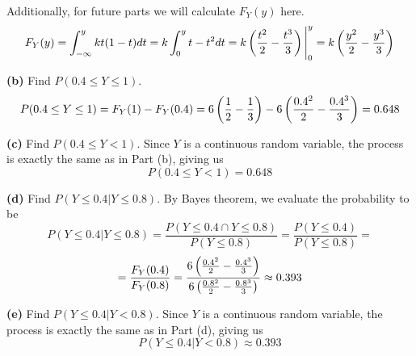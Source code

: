 \documentclass{exam}
\begin{document}
\begin{questions}
Additionally, for future parts we will calculate $F_Y(y)$ here.
$$F_Y(y) = \int_{-\infty}^y kt(1 - t)dt = k\int_0^yt - t^2dt = k\left( \frac{t^2}{2} - \frac{t^3}{3} \right)\Bigg|_0^y = k\left( \frac{y^2}{2} - \frac{y^3}{3} \right)$$

\newline
\textbf{(b) } Find $P(0.4 \leq Y \leq 1)$.
\sol
$$P(0.4 \leq Y \leq 1) = F_Y(1) - F_Y(0.4) = 6\left( \frac{1}{2} - \frac{1}{3} \right) - 6\left( \frac{0.4^2}{2} - \frac{0.4^3}{3} \right) = 0.648$$

\newline
\textbf{(c) } Find $P(0.4 \leq Y < 1)$.
\sol
Since $Y$ is a continuous random variable, the process is exactly the same as in Part (b), giving us
$$P(0.4 \leq Y < 1) = 0.648$$

\newline
\textbf{(d) } Find $P(Y \leq 0.4 | Y \leq 0.8)$.
\sol
By Bayes theorem, we evaluate the probability to be
$$P(Y \leq 0.4 | Y \leq 0.8) = \frac{P(Y \leq 0.4 \cap Y \leq 0.8)}{P(Y \leq 0.8)} = \frac{P(Y \leq 0.4)}{P(Y \leq 0.8)} =$$
$$= \frac{F_Y(0.4)}{F_Y(0.8)} = \frac{6\left( \frac{0.4^2}{2} - \frac{0.4^3}{3} \right)}{6\left( \frac{0.8^2}{2} - \frac{0.8^3}{3} \right)} \approx 0.393$$

\newline
\textbf{(e) } Find $P(Y \leq 0.4 | Y < 0.8)$.
\sol
Since $Y$ is a continuous random variable, the process is exactly the same as in Part (d), giving us
$$P(Y \leq 0.4 | Y < 0.8) \approx 0.393$$
\end{questions}
\end{document}
